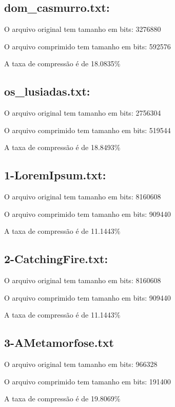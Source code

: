 \documentclass[12pt]{article}
\begin{document}
\subsection{dom\_casmurro.txt:}
\space \par O arquivo original tem tamanho em bits: 3276880
\space \par O arquivo comprimido tem tamanho em bits: 592576
\space \par A taxa de compressão é de  18.0835\% 

\subsection{os\_lusiadas.txt:} 
\space \par O arquivo original tem tamanho em bits: 2756304
\space \par O arquivo comprimido tem tamanho em bits: 519544
\space \par A taxa de compressão é de 18.8493\%

\subsection{1-LoremIpsum.txt:} 
\space \par O arquivo original tem tamanho em bits: 8160608
\space \par O arquivo comprimido tem tamanho em bits: 909440
\space \par A taxa de compressão é de 11.1443\%

\subsection{2-CatchingFire.txt:} 
\space \par O arquivo original tem tamanho em bits: 8160608
\space \par O arquivo comprimido tem tamanho em bits: 909440
\space \par A taxa de compressão é de 11.1443\%

\subsection{3-AMetamorfose.txt}                            
\space \par O arquivo original tem tamanho em bits: 966328
\space \par O arquivo comprimido tem tamanho em bits: 191400
\space \par A taxa de compressão é de 19.8069\%
\end{document}
